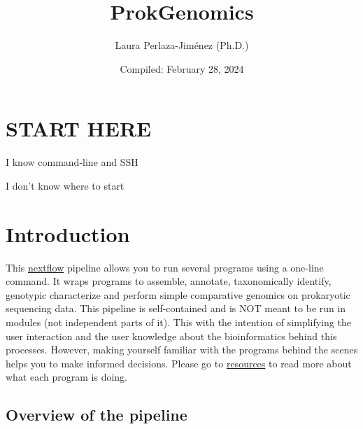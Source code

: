 \documentclass[
]{book}
\title{ProkGenomics}
\author{Laura Perlaza-Jiménez (Ph.D.)}
\date{Compiled: February 28, 2024}
\begin{document}
\maketitle

{
\setcounter{tocdepth}{1}
\tableofcontents
}
\hypertarget{start-here}{%
\chapter{START HERE}\label{start-here}}

{I know command-line and SSH}

{I don't know where to start}

\hypertarget{introduction}{%
\chapter{Introduction}\label{introduction}}

This \href{https://www.nextflow.io/}{nextflow} pipeline allows you to run several programs using a one-line command. It wraps programs to assemble, annotate, taxonomically identify, genotypic characterize and perform simple comparative genomics on prokaryotic sequencing data. This pipeline is self-contained and is NOT meant to be run in modules (not independent parts of it). This with the intention of simplifying the user interaction and the user knowledge about the bioinformatics behind this processes. However, making yourself familiar with the programs behind the scenes helps you to make informed decisions. Please go to \href{resources.html}{resources} to read more about what each program is doing.

\hypertarget{overview-of-the-pipeline}{%
\section{Overview of the pipeline}\label{overview-of-the-pipeline}}
\end{document}
